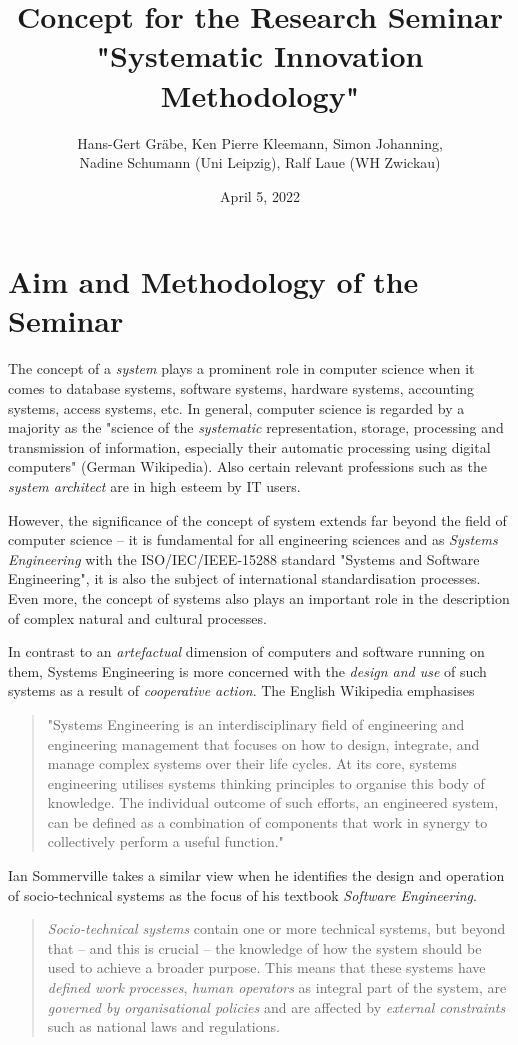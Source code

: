 \documentclass[11pt,a4paper]{article}
\title{Concept for the Research Seminar\\ "Systematic Innovation Methodology"}
\author{Hans-Gert Gr\"abe, Ken Pierre Kleemann, Simon Johanning,\\ Nadine
  Schumann (Uni Leipzig), Ralf Laue (WH Zwickau) }
\date{April 5, 2022}
\begin{document}
\maketitle

\section{Aim and Methodology of the Seminar}

The concept of a \emph{system} plays a prominent role in computer science when
it comes to database systems, software systems, hardware systems, accounting
systems, access systems, etc.  In general, computer science is regarded by a
majority as the "science of the \emph{systematic} representation, storage,
processing and transmission of information, especially their automatic
processing using digital computers" (German Wikipedia).  Also certain relevant
professions such as the \emph{system architect} are in high esteem by IT
users.

However, the significance of the concept of system extends far beyond the
field of computer science -- it is fundamental for all engineering sciences
and as \emph{Systems Engineering} with the ISO/IEC/IEEE-15288 standard
"Systems and Software Engineering", it is also the subject of international
standardisation processes.  Even more, the concept of systems also plays an
important role in the description of complex natural and cultural processes.

In contrast to an \emph{artefactual} dimension of computers and software
running on them, Systems Engineering is more concerned with the \emph{design
  and use} of such systems as a result of \emph{cooperative action}.  The
English Wikipedia emphasises 
\begin{quote}
  "Systems Engineering is an interdisciplinary field of engineering and
  engineering management that focuses on how to design, integrate, and manage
  complex systems over their life cycles. At its core, systems engineering
  utilises systems thinking principles to organise this body of knowledge. The
  individual outcome of such efforts, an engineered system, can be defined as
  a combination of components that work in synergy to collectively perform a
  useful function."
\end{quote}

Ian Sommerville takes a similar view when he identifies the design and
operation of socio-technical systems as the focus of his textbook
\emph{Software Engineering}.
\begin{quote}  
  \emph{Socio-technical systems} contain one or more technical systems, but
  beyond that – and this is crucial – the knowledge of how the system should
  be used to achieve a broader purpose. This means that these systems have
  \emph{defined work processes}, \emph{human operators} as integral part of
  the system, are \emph{governed by organisational policies} and are affected
  by \emph{external constraints} such as national laws and regulations.
  \cite[p. 48]{Sommerville}
\end{quote}
\end{document}
